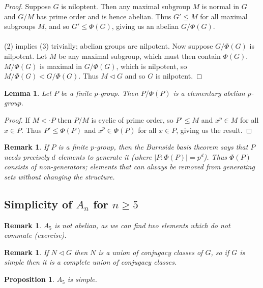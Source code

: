 \documentclass[a4paper,10pt]{article}
\newtheorem{prop}[thm]{Proposition}
\newtheorem{Lem}[thm]{Lemma}
\newtheorem{rem}[thm]{Remark}
\begin{document}
\begin{proof}
Suppose $G$ is niloptent. Then any maximal subgroup $M$ is normal in $G$ and $G / M$ has prime order and is hence abelian. Thus $G' \leq M$ for all maximal subgroups $M$, and so $G' \leq \Phi(G)$, giving us an abelian $G / \Phi(G)$. \\
\\
(2) implies (3) trivially; abelian groups are nilpotent. Now suppose $G / \Phi(G)$ is nilpotent. Let $M$ be any maximal subgroup, which must then contain $\Phi(G)$. $M / \Phi(G)$ is maximal in $G / \Phi(G)$, which is nilpotent, so $M / \Phi(G) \triangleleft G / \Phi(G)$. Thus $M \triangleleft G$ and so $G$ is nilpotent. 
\end{proof}

\begin{Lem}
Let $P$ be a finite $p$-group. Then $P / \Phi(P)$ is a elementary abelian $p$-group. 
\end{Lem}

\begin{proof}
If $M < \cdot P$ then $P / M$ is cyclic of prime order, so $P' \leq M$ and $x^p \in M$ for all $x \in P$. Thus $P' \leq \Phi(P)$ and $x^p \in \Phi(P)$ for all $x \in P$, giving us the result. 
\end{proof}

\begin{rem}
If $P$ is a finite $p$-group, then the Burnside basis theorem says that $P$ needs precisely $d$ elements to generate it (where $|P : \Phi(P)| = p^d$). Thus $\Phi(P)$ consists of non-generators; elements that can always be removed from generating sets without changing the structure.
\end{rem}

\subsection{Simplicity of $A_n$ for $n \geq 5$}

\begin{rem}
$A_5$ is not abelian, as we can find two elements which do not commute (exercise).
\end{rem}

\begin{rem}
If $N \triangleleft G$ then $N$ is a union of conjugacy classes of $G$, so if $G$ is simple then it is a complete union of conjugacy classes.
\end{rem}

\begin{prop}
$A_5$ is simple.
\end{prop}
\end{document}
